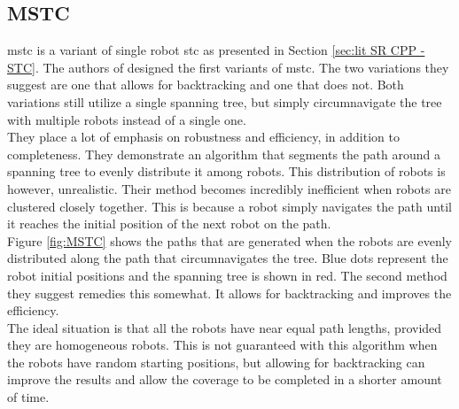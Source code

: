 \subsection{MSTC}
\label{subsec:mstc}
\acf{mstc} is a variant of single robot \acf{stc} as presented in Section \ref{sec:lit SR CPP - STC}. The authors of \cite{Hazon2005} designed the first variants of \acs{mstc}. The two variations they suggest are one that allows for backtracking and one that does not. Both variations still utilize a single spanning tree, but simply circumnavigate the tree with multiple robots instead of a single one.\\
They place a lot of emphasis on robustness and efficiency, in addition to completeness. They demonstrate an algorithm that segments the path around a spanning tree to evenly distribute it among robots. This distribution of robots is however, unrealistic. Their method becomes incredibly inefficient when robots are clustered closely together. This is because a robot simply navigates the path until it reaches the initial position of the next robot on the path.\\
Figure \ref{fig:MSTC} shows the paths that are generated when the robots are evenly distributed along the path that circumnavigates the tree. Blue dots represent the robot initial positions and the spanning tree is shown in red. The second method they suggest remedies this somewhat. It allows for backtracking and improves the efficiency.\\
The ideal situation is that all the robots have near equal path lengths, provided they are homogeneous robots. This is not guaranteed with this algorithm when the robots have random starting positions, but allowing for backtracking can improve the results and allow the coverage to be completed in a shorter amount of time.\\
